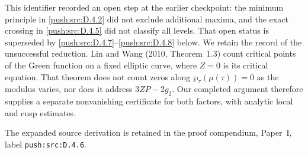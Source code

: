 \begin{cited}\label{push:src:D.4.6}

This identifier recorded an open step at the earlier checkpoint:
the minimum principle in \ref{push:src:D.4.2} did not exclude additional maxima,
and the exact crossing in \ref{push:src:D.4.5} did not classify all levels. That
open status is superseded by \ref{push:src:D.4.7}--\ref{push:src:D.4.8} below. We retain the
record of the unsuccessful reduction. Lin and Wang (2010,
Theorem~1.3) count critical points of the Green function on a fixed
elliptic curve, where \(Z=0\) is its critical equation. That theorem
does not count zeros along \(\wp_\tau(\mu(\tau))=0\) as the modulus
varies, nor does it address \(3ZP-2g_2\). Our completed argument
therefore supplies a separate nonvanishing certificate for both
factors, with analytic local and cusp estimates.
\end{cited}
The expanded source derivation is retained in the proof compendium, Paper~I, label \nolinkurl{push:src:D.4.6}.




